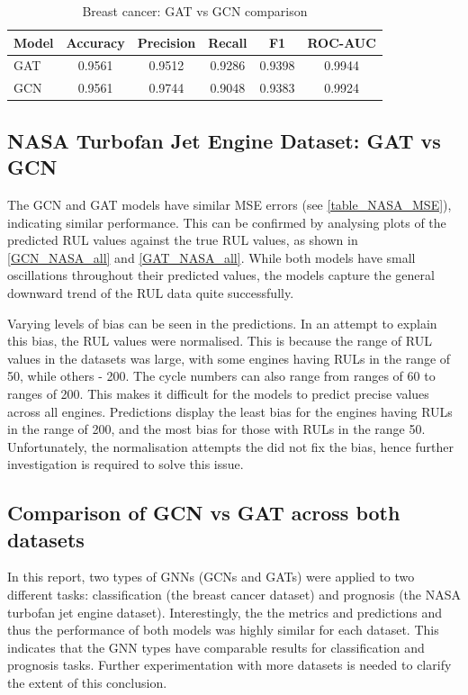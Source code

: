\documentclass[12pt]{article}
\begin{document}
\begin{table}[H]
\centering
\caption{Breast cancer: GAT vs GCN comparison}
\begin{tabular}{|l|c|c|c|c|c|}
\hline
\textbf{Model} & \textbf{Accuracy} & \textbf{Precision} & \textbf{Recall} & \textbf{F1} & \textbf{ROC-AUC} \\
\hline
GAT & 0.9561 & 0.9512 & 0.9286 & 0.9398 & 0.9944 \\
GCN & 0.9561 & 0.9744 & 0.9048 & 0.9383 & 0.9924 \\
\hline
\end{tabular}

\end{table}

\subsection{NASA Turbofan Jet Engine Dataset: GAT vs GCN}
The GCN and GAT models have similar MSE errors (see \autoref{table_NASA_MSE}), indicating similar performance. This can be confirmed by analysing plots of the predicted RUL values against the true RUL values, as shown in \autoref{GCN_NASA_all} and \autoref{GAT_NASA_all}. While both models have small oscillations throughout their predicted values, the models capture the general downward trend of the RUL data quite successfully. 

Varying levels of bias can be seen in the predictions. In an attempt to explain this bias, the RUL values were normalised. This is because the range of RUL values in the datasets was large, with some engines having RULs in the range of 50, while others - 200. The cycle numbers can also range from ranges of 60 to ranges of 200. This makes it difficult for the models to predict precise values across all engines. Predictions display the least bias for the engines having RULs in the range of 200, and the most bias for those with RULs in the range 50. Unfortunately, the normalisation attempts the did not fix the bias, hence further investigation is required to solve this issue.

\subsection{Comparison of GCN vs GAT across both datasets}
In this report, two types of GNNs (GCNs and GATs) were applied to two different tasks: classification (the breast cancer dataset) and prognosis (the NASA turbofan jet engine dataset). Interestingly, the the metrics and predictions and thus the performance of both models was highly similar for each dataset. This indicates that the GNN types have comparable results for classification and prognosis tasks. Further experimentation with more datasets is needed to clarify the extent of this conclusion.
\end{document}
